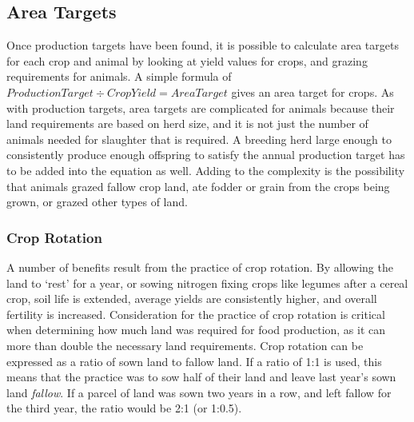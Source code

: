 \subsection{Area Targets}
	\label{AreaTargets}
Once production targets have been found, it is possible to calculate area targets for each crop and animal by looking at yield values for crops, and grazing requirements for animals. A simple formula of $Production Target \div Crop Yield=Area Target$ gives an area target for crops. As with production targets, area targets are complicated for animals because their land requirements are based on herd size, and it is not just the number of animals needed for slaughter that is required.  A breeding herd large enough to consistently produce enough offspring to satisfy the annual production target has to be added into the equation as well.
Adding to the complexity is the possibility that animals grazed fallow crop land, ate fodder or grain from the crops being grown, or grazed other types of land.

\subsubsection{Crop Rotation}
	\label{cropRotation} 
	A number of benefits result from the practice of crop rotation.  By allowing the land to `rest' for a year, or sowing nitrogen fixing crops like legumes after a cereal crop, soil life is extended, average yields are consistently higher, and overall fertility is increased. %
Consideration for the practice of crop rotation is critical when determining how much land was required for food production, as it can more than double the necessary land requirements. Crop rotation can be expressed as a ratio of sown land to fallow land. If a ratio of 1:1 is used, this means that the practice was to sow half of their land and leave last year's sown land \textit{fallow}. If a parcel of land was sown two years in a row, and left fallow for the third year, the ratio would be 2:1 (or 1:0.5). 

